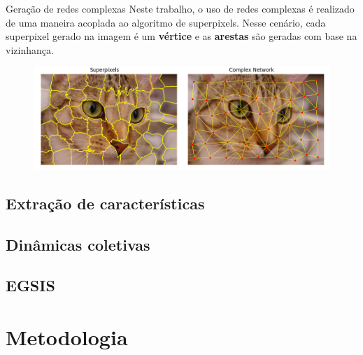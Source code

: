\documentclass{templatebeamerufc/libs/ufc_format}
\begin{document}
\begin{frame}{Geração de redes complexas}
  Neste trabalho, o uso de redes complexas é realizado de uma maneira
acoplada ao algoritmo de superpixels. Nesse cenário, cada superpixel
gerado na imagem é um \textbf{vértice} e as \textbf{arestas} são
geradas com base na vizinhança.

\begin{figure}\label{fig:slic}
     \centering
        \includegraphics[scale=0.32]{figuras/complex-networks-simplified}
   \end{figure}
\end{frame}

\subsection{Extração de características}
\subsection{Dinâmicas coletivas}
\subsection{EGSIS}

\section{Metodologia}

\end{document}
